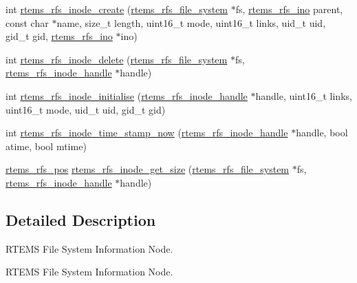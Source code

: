 \begin{DoxyCompactItemize}
\item 
int \mbox{\hyperlink{rtems-rfs-inode_8h_a84fd42caa1f9dada5918fbb1e42c7978}{rtems\+\_\+rfs\+\_\+inode\+\_\+create}} (\mbox{\hyperlink{struct__rtems__rfs__file__system}{rtems\+\_\+rfs\+\_\+file\+\_\+system}} $\ast$fs, \mbox{\hyperlink{rtems-rfs-inode_8h_ae658325c3ff9941f2e68315d20e3c723}{rtems\+\_\+rfs\+\_\+ino}} parent, const char $\ast$name, size\+\_\+t length, uint16\+\_\+t mode, uint16\+\_\+t links, uid\+\_\+t uid, gid\+\_\+t gid, \mbox{\hyperlink{rtems-rfs-inode_8h_ae658325c3ff9941f2e68315d20e3c723}{rtems\+\_\+rfs\+\_\+ino}} $\ast$ino)
\item 
int \mbox{\hyperlink{rtems-rfs-inode_8h_a4630b6fa02927ccf6cbe2205824ccc75}{rtems\+\_\+rfs\+\_\+inode\+\_\+delete}} (\mbox{\hyperlink{struct__rtems__rfs__file__system}{rtems\+\_\+rfs\+\_\+file\+\_\+system}} $\ast$fs, \mbox{\hyperlink{rtems-rfs-inode_8h_a91f02dac5a2d91e072d676f3266ab8d2}{rtems\+\_\+rfs\+\_\+inode\+\_\+handle}} $\ast$handle)
\item 
int \mbox{\hyperlink{rtems-rfs-inode_8h_a7e3f134bbdf115ba538a228ff34a0bce}{rtems\+\_\+rfs\+\_\+inode\+\_\+initialise}} (\mbox{\hyperlink{rtems-rfs-inode_8h_a91f02dac5a2d91e072d676f3266ab8d2}{rtems\+\_\+rfs\+\_\+inode\+\_\+handle}} $\ast$handle, uint16\+\_\+t links, uint16\+\_\+t mode, uid\+\_\+t uid, gid\+\_\+t gid)
\item 
int \mbox{\hyperlink{rtems-rfs-inode_8h_ac67c5e1bc5e79949ac7ed82239c67166}{rtems\+\_\+rfs\+\_\+inode\+\_\+time\+\_\+stamp\+\_\+now}} (\mbox{\hyperlink{rtems-rfs-inode_8h_a91f02dac5a2d91e072d676f3266ab8d2}{rtems\+\_\+rfs\+\_\+inode\+\_\+handle}} $\ast$handle, bool atime, bool mtime)
\item 
\mbox{\hyperlink{rtems-rfs-file-system_8h_ae6adc04fe673c46403605d64f16699bd}{rtems\+\_\+rfs\+\_\+pos}} \mbox{\hyperlink{rtems-rfs-inode_8h_ab72a7a18e25bf5450738de33dfd4c832}{rtems\+\_\+rfs\+\_\+inode\+\_\+get\+\_\+size}} (\mbox{\hyperlink{struct__rtems__rfs__file__system}{rtems\+\_\+rfs\+\_\+file\+\_\+system}} $\ast$fs, \mbox{\hyperlink{rtems-rfs-inode_8h_a91f02dac5a2d91e072d676f3266ab8d2}{rtems\+\_\+rfs\+\_\+inode\+\_\+handle}} $\ast$handle)
\end{DoxyCompactItemize}


\subsection{Detailed Description}
R\+T\+E\+MS File System Information Node. 

R\+T\+E\+MS File System Information Node.

